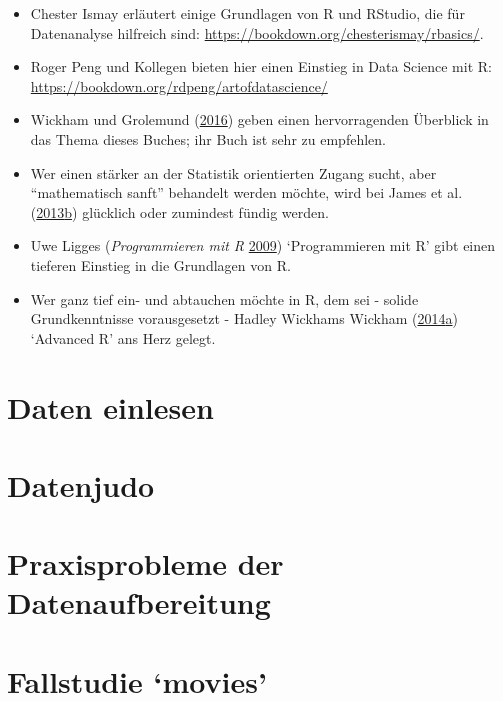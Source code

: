 \documentclass[12pt,ngerman,]{book}
\theoremstyle{definition}
\theoremstyle{definition}
\theoremstyle{remark}
\begin{document}
\begin{itemize}
\item
  Chester Ismay erläutert einige Grundlagen von R und RStudio, die für
  Datenanalyse hilfreich sind:
  \url{https://bookdown.org/chesterismay/rbasics/}.
\item
  Roger Peng und Kollegen bieten hier einen Einstieg in Data Science mit
  R: \url{https://bookdown.org/rdpeng/artofdatascience/}
\item
  Wickham und Grolemund (\protect\hyperlink{ref-r4ds}{2016}) geben einen
  hervorragenden Überblick in das Thema dieses Buches; ihr Buch ist sehr
  zu empfehlen.
\item
  Wer einen stärker an der Statistik orientierten Zugang sucht, aber
  ``mathematisch sanft'' behandelt werden möchte, wird bei James et al.
  (\protect\hyperlink{ref-introstatlearning}{2013}\protect\hyperlink{ref-introstatlearning}{b})
  glücklich oder zumindest fündig werden.
\item
  Uwe Ligges (\emph{Programmieren mit R}
  \protect\hyperlink{ref-ligges}{2009}) `Programmieren mit R' gibt einen
  tieferen Einstieg in die Grundlagen von R.
\item
  Wer ganz tief ein- und abtauchen möchte in R, dem sei - solide
  Grundkenntnisse vorausgesetzt - Hadley Wickhams Wickham
  (\protect\hyperlink{ref-wickham2014advanced}{2014}\protect\hyperlink{ref-wickham2014advanced}{a})
  `Advanced R' ans Herz gelegt.
\end{itemize}

\chapter{Daten einlesen}\label{daten-einlesen}

\chapter{Datenjudo}\label{Datenjudo}

\chapter{Praxisprobleme der
Datenaufbereitung}\label{praxisprobleme-der-datenaufbereitung}

\chapter{\texorpdfstring{Fallstudie
`movies'}{Fallstudie movies}}\label{case-movies}
\end{document}
